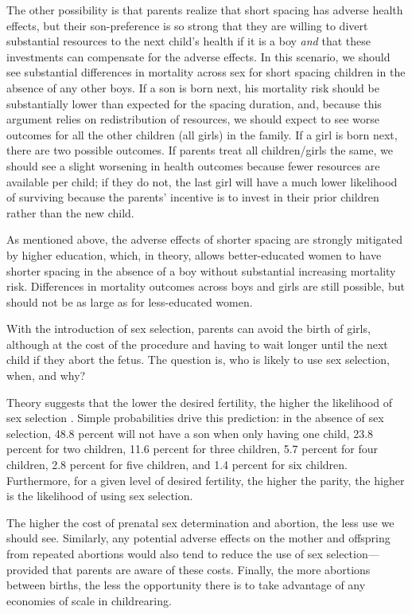 The other possibility is that parents realize that short spacing has adverse health effects, 
but their son-preference is so strong that they are willing to divert substantial resources 
to the next child's health if it is a boy \emph{and} that these investments can 
compensate for the adverse effects.
In this scenario, we should see substantial differences in mortality across sex for short spacing 
children in the absence of any other boys.
If a son is born next, his mortality risk should be substantially lower than expected for 
the spacing duration, and, because this argument relies on redistribution of resources, we should 
expect to see worse outcomes for all the other children (all girls) in the family.
If a girl is born next, there are two possible outcomes.
If parents treat all children/girls the same, we should see a slight worsening in health 
outcomes because fewer resources are available per child; 
if they do not, the last girl will have a much lower likelihood of surviving because the 
parents' incentive is to invest in their prior children rather than the new child.

As mentioned above, the adverse effects of shorter spacing are strongly mitigated by higher 
education, which, in theory, allows better-educated women
to have shorter spacing in the 
absence of a boy without substantial increasing mortality risk.
Differences in mortality outcomes across boys and girls are still possible,
but should not be as large as for less-educated women.

With the introduction of sex selection, parents can avoid the birth of girls, although at the cost of the procedure and having to wait longer until 
the next child if they abort the fetus.
The question is, who is likely to use sex selection, when, and why?

Theory suggests that the lower the desired fertility, the 
higher the likelihood of sex selection \citep{Portner2015b}.
Simple probabilities drive this prediction:
in the absence of sex selection, 
48.8 percent will not have a son when only having one child, 
23.8 percent for two children, 11.6 percent for three children, 
5.7 percent for four children, 2.8 percent for five children, 
and 1.4 percent for six children.
Furthermore, for a given level of desired fertility, the higher
the parity, the higher is the likelihood of using sex selection.

The higher the cost of prenatal sex determination and abortion,
the less use we should see.
Similarly, any potential adverse effects on the mother and 
offspring from repeated
abortions would also tend to reduce the use of sex selection---
provided that parents are aware of these costs.
Finally, the more abortions between births, the less the opportunity there is to take
advantage of any economies of scale in childrearing.

